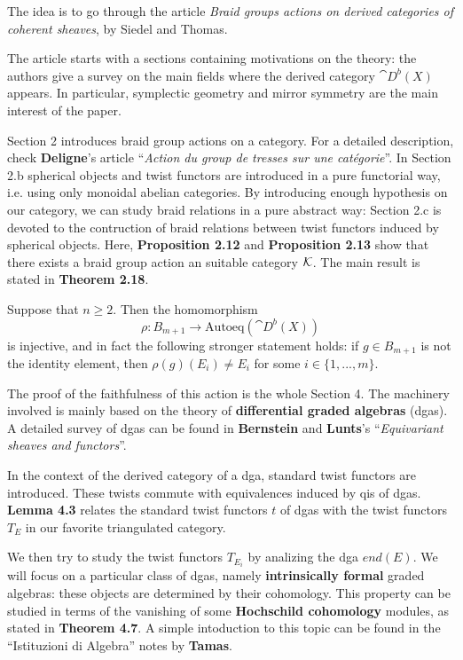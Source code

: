 
The idea is to go through the article 
\emph{Braid groups actions on derived categories of coherent sheaves},
by Siedel and Thomas.

The article starts with a sections containing 
motivations on the theory: the authors give a survey on 
the main fields where the derived category $\cat{D}^{b}(X)$
appears. In particular, symplectic geometry
and mirror symmetry are the main interest of the paper.

Section 2 introduces braid group actions on a category.
For a detailed description, check \textbf{Deligne}'s article
``\emph{Action du group de tresses sur une catégorie}''.
In Section 2.b spherical objects and twist functors are
introduced in a pure functorial way, i.e. using only
monoidal abelian categories.
By introducing enough hypothesis on our category,
we can study braid relations in a pure abstract way:
Section 2.c is devoted to the contruction of braid relations
between twist functors induced by spherical objects.
Here, \textbf{Proposition 2.12} and \textbf{Proposition 2.13}
show that there exists a braid group action an suitable
category $\mathcal{K}$. The main result is stated in \textbf{Theorem 2.18}.

\begin{thm**}
	Suppose that $n \ge 2$. Then the homomorphism 
	\begin{equation*}
	 	\rho : B_{m+1} \longrightarrow \textrm{Autoeq}(\cat{D}^{b}(X))
	 \end{equation*} 
	is injective, and in fact the following stronger statement holds: 
	if $g \in B_{m+1}$ is not the identity element, 
	then $\rho(g)(E_{i}) \ne E_{i}$ for some $i \in \{1,...,m\}$.
\end{thm**}

The proof of the faithfulness of this action
is the whole Section 4.
The machinery involved is mainly based on
the theory of \textbf{differential graded algebras} (dgas).
A detailed survey of dgas can be found in
\textbf{Bernstein} and \textbf{Lunts}'s
``\emph{Equivariant sheaves and functors}''.

In the context of the derived category of a dga,
standard twist functors are introduced.
These twists commute with equivalences induced 
by qis of dgas.
\textbf{Lemma 4.3} relates the standard twist functors $t$
of dgas with the twist functors $T_{E}$ in our favorite triangulated category.

We then try to study the twist functors $T_{E_{i}}$
by analizing the dga $end(E)$. We will focus
on a particular class of dgas, 
namely \textbf{intrinsically formal} graded algebras:
these objects are determined by their cohomology.
This property can be studied in terms
of the vanishing of some \textbf{Hochschild cohomology} modules,
as stated in \textbf{Theorem 4.7}.
A simple intoduction to this topic can be found
in the ``Istituzioni di Algebra'' notes by \textbf{Tamas}.

